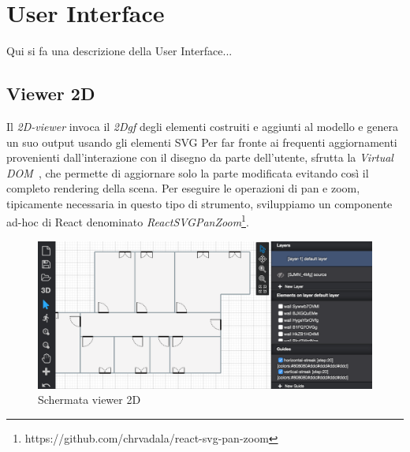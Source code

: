 \newpage
\section{User Interface}
\label{sec:chapter_2_section_4}

Qui si fa una descrizione della User Interface...

\subsection{Viewer 2D}
Il \emph{2D-viewer} invoca il  \emph{2Dgf} degli elementi costruiti e aggiunti al modello e genera un suo output usando gli elementi SVG
Per far fronte ai frequenti aggiornamenti provenienti dall'interazione con il disegno da parte dell'utente,
sfrutta la \emph{Virtual DOM}~\cite{vdom}, che permette di aggiornare solo la parte modificata evitando così
il completo rendering della scena. Per eseguire le operazioni di pan e zoom, tipicamente necessaria in questo
tipo di strumento, sviluppiamo un componente ad-hoc di React denominato \emph{ReactSVGPanZoom}\footnote{https://github.com/chrvadala/react-svg-pan-zoom}.\\


\begin{figure}[htbp] %
   \centering
   \includegraphics[width=1\linewidth]{images/2d}
   \caption{Schermata viewer 2D}
   \label{fig:view2D}
\end{figure}
\newpage


